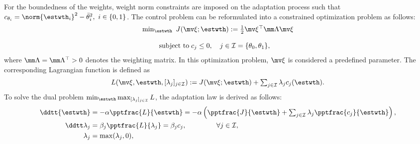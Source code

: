 \documentclass[letterpaper, 10 pt, conference]{ieeeconf}  %
\begin{document}
For the boundedness of the weights, weight norm constraints are imposed on the adaptation process such that $c_{\theta_i}=\norm{{\estwth}_i}^2-\bar\theta^2_i,\ i\in\{0,1\}$.
The control problem can be reformulated into a constrained optimization problem as follows:
\begin{equation}
    \begin{matrix}
        \min_{{\estwth}} \ J(\mv \xi;{\estwth})
        :=
        \tfrac{1}{2}
        \mv \xi^\top \mm \Lambda \mv \xi
        \\ \\
        \begin{aligned}
        \text{subject to\;}&c_{j}\le0, \quad j\in\mathcal I 
        = 
        \{\theta_0,\theta_1\}
        ,
        \end{aligned}
    \end{matrix}
\end{equation}
where $\mm \Lambda=\mm \Lambda^\top >0$ denotes the weighting matrix.
In this optimization problem, $\mv \xi$ is considered a predefined parameter.
The corresponding Lagrangian function is defined as
\begin{equation}
    L(
        \mv \xi,
        {\estwth},
        [\lambda_j]_{j\in\mathcal I}
    )
    := 
    J(\mv \xi;{\estwth})
    +
    \textstyle\sum_{j\in\mathcal I} \lambda_jc_j({\estwth})
    .
\end{equation}
To solve the dual problem $\min_{{\estwth}} \max_{[\lambda_j]_{j\in\mathcal I}}  L$, the adaptation law is derived as follows:
\begin{subequations}
    \begin{align}
            \ddtt {{\estwth}}
            &
            =
            -\alpha 
            \pptfrac{L}{{\estwth}}
            =-\alpha 
            \left(
                \pptfrac{J}{{\estwth}}
                +
                \textstyle\sum_{j\in\mathcal{I}}
                \lambda_j 
                \pptfrac{c_j}{\estwth}
            \right),
        \label{eq. adaptation law th}
            \\
            \ddtt\lambda_j
            & 
            = 
            \beta_j
            \pptfrac{L}{\lambda_j} 
            = 
            \beta_j c_j ,
            \quad\quad\quad\quad      \      
            \forall j\in\mathcal I,
        \label{eq. adaptation law L}
            \\
            \lambda_j 
            & 
            = 
            \max(\lambda_j,0) ,
        \label{eq. adaptation law L max}
    \end{align}
    \label{eq. adaptation laws}
\end{subequations}
\end{document}
